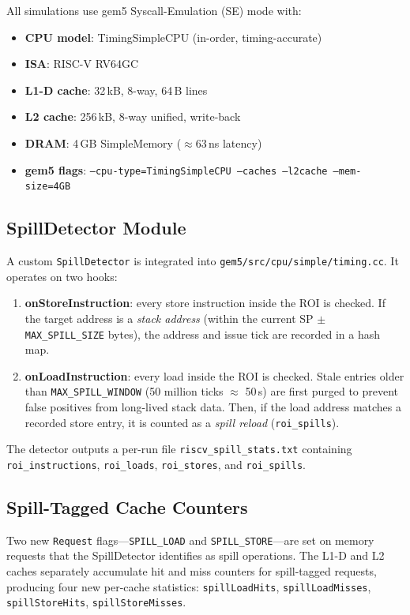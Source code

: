 \documentclass[11pt,a4paper]{article}
\begin{document}
All simulations use gem5 Syscall-Emulation (SE) mode with:
\begin{itemize}
  \item \textbf{CPU model}: TimingSimpleCPU (in-order, timing-accurate)
  \item \textbf{ISA}: RISC-V RV64GC
  \item \textbf{L1-D cache}: 32\,kB, 8-way, 64\,B lines
  \item \textbf{L2 cache}: 256\,kB, 8-way unified, write-back
  \item \textbf{DRAM}: 4\,GB SimpleMemory ($\approx$63\,ns latency)
  \item \textbf{gem5 flags}: \texttt{--cpu-type=TimingSimpleCPU --caches --l2cache --mem-size=4GB}
\end{itemize}

\subsection{SpillDetector Module}

A custom \texttt{SpillDetector} is integrated into
\texttt{gem5/src/cpu/simple/timing.cc}.  It operates on two hooks:
\begin{enumerate}
  \item \textbf{onStoreInstruction}: every store instruction inside the
    ROI is checked.  If the target address is a \emph{stack address}
    (within the current SP $\pm$ \texttt{MAX\_SPILL\_SIZE} bytes), the
    address and issue tick are recorded in a hash map.
  \item \textbf{onLoadInstruction}: every load inside the ROI is checked.
    Stale entries older than \texttt{MAX\_SPILL\_WINDOW}
    (50 million ticks $\approx$ 50\,\textmu s) are first purged
    to prevent false positives from long-lived stack data.
    Then, if the load address matches a recorded store entry, it is
    counted as a \emph{spill reload} (\texttt{roi\_spills}).
\end{enumerate}

The detector outputs a per-run file
\texttt{riscv\_spill\_stats.txt} containing
\texttt{roi\_instructions}, \texttt{roi\_loads}, \texttt{roi\_stores},
and \texttt{roi\_spills}.

\subsection{Spill-Tagged Cache Counters}

Two new \texttt{Request} flags---\texttt{SPILL\_LOAD} and
\texttt{SPILL\_STORE}---are set on memory requests that the
SpillDetector identifies as spill operations.  The L1-D and L2
caches separately accumulate hit and miss counters for
spill-tagged requests, producing four new per-cache statistics:
\texttt{spillLoadHits}, \texttt{spillLoadMisses},
\texttt{spillStoreHits}, \texttt{spillStoreMisses}.
\end{document}
